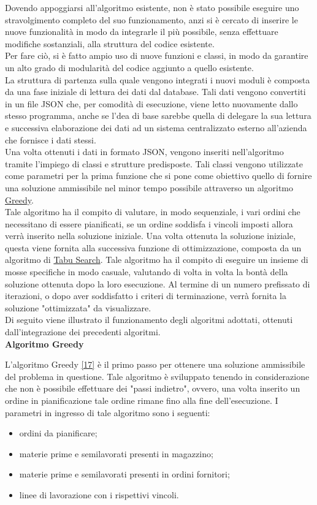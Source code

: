 Dovendo appoggiarsi all'algoritmo esistente, non è stato possibile eseguire uno stravolgimento completo del suo funzionamento, anzi si è cercato di inserire le nuove funzionalità
in modo da integrarle il più possibile, senza effettuare modifiche sostanziali, alla struttura del codice esistente.\\ Per fare ciò, si è fatto ampio uso di nuove funzioni e
classi, in modo da garantire un alto grado di modularità del codice aggiunto a quello esistente.
\\ La struttura di partenza sulla quale vengono integrati i nuovi moduli è composta da una fase iniziale
di lettura dei dati dal database. Tali dati vengono convertiti in un file JSON che, per comodità di esecuzione, viene letto nuovamente dallo stesso programma, anche se
l'dea di base sarebbe quella di delegare la sua lettura e successiva elaborazione dei dati ad un sistema centralizzato esterno all'azienda che fornisce i dati stessi.\\
Una volta ottenuti i dati in formato JSON, vengono inseriti nell'algoritmo tramite l'impiego di classi e strutture predisposte. Tali classi vengono utilizzate come parametri
per la prima funzione che si pone come obiettivo quello di fornire una soluzione ammissibile nel minor tempo possibile attraverso un algoritmo \hyperref[Greedy]{Greedy\glo}.\\
Tale algoritmo ha il compito di valutare, in modo sequenziale, i vari ordini che necessitano di essere pianificati, se un ordine soddisfa i vincoli imposti allora verrà inserito nella soluzione iniziale.
Una volta ottenuta la soluzione iniziale, questa viene fornita alla successiva funzione di ottimizzazione, composta da un algoritmo di \hyperref[Tabu Search]{Tabu Search\glo}. Tale algoritmo ha il compito
di eseguire un insieme di mosse specifiche in modo casuale, valutando di volta in volta la bontà della soluzione ottenuta dopo la loro esecuzione. Al termine di un numero prefissato
di iterazioni, o dopo aver soddisfatto i criteri di terminazione, verrà fornita la soluzione "ottimizzata" da visualizzare.\\
Di seguito viene illustrato il funzionamento degli algoritmi adottati, ottenuti dall'integrazione dei precedenti algoritmi.\\

\textbf{Algoritmo Greedy}

L'algoritmo Greedy \hyperref[greedy]{[17]} è il primo passo per ottenere una soluzione ammissibile del problema in questione. Tale algoritmo è sviluppato tenendo in considerazione che non è possibile effettuare dei "passi indietro",
ovvero, una volta inserito un ordine in pianificazione tale ordine rimane fino alla fine dell'esecuzione. I parametri in ingresso di tale algoritmo sono i seguenti:
\begin{itemize}
    \item ordini da pianificare;
    \item materie prime e semilavorati presenti in magazzino;
    \item materie prime e semilavorati presenti in ordini fornitori;
    \item linee di lavorazione con i rispettivi vincoli.
\end{itemize}

